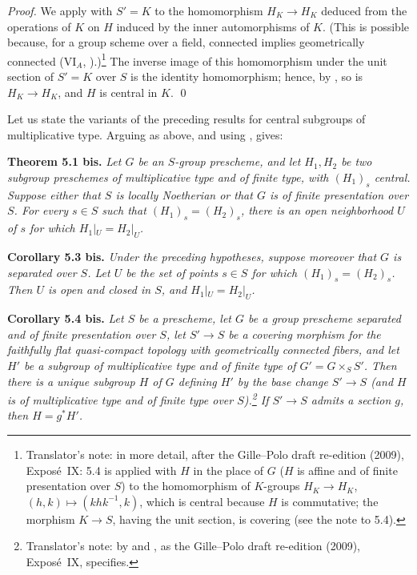 \emph{Proof.}
We apply  with \(S'=K\) to the
homomorphism \(H_K\to H_K\) deduced from the operations of \(K\) on \(H\)
induced by the inner automorphisms of \(K\). (This is possible because,
for a group scheme over a field, connected implies geometrically
connected (VI\(_A\), ).)\footnote{Translator's
note: in more detail, after the Gille--Polo draft re-edition (2009),
Expos\'e~IX: 5.4 is applied with \(H\) in the place of \(G\) (\(H\) is
affine and of finite presentation over \(S\)) to the homomorphism of
\(K\)-groups \(H_K\to H_K\), \((h,k)\mapsto(khk^{-1},k)\), which is central
because \(H\) is commutative; the morphism \(K\to S\), having the unit
section, is covering (see the note to 5.4).} The inverse image of this
homomorphism under the unit section of \(S'=K\) over \(S\) is the identity
homomorphism; hence, by , so is
\(H_K\to H_K\), and \(H\) is central in \(K\). \qed

Let us state the variants of the preceding results for central subgroups
of multiplicative type. Arguing as above, and using
, gives:

\medskip
\noindent{}\textbf{Theorem 5.1 bis.}
\textit{Let \(G\) be an \(S\)-group prescheme, and let \(H_1,H_2\) be
two subgroup preschemes of multiplicative type and of finite type, with
\((H_1)_s\) central. Suppose either that \(S\) is locally Noetherian or
that \(G\) is of finite presentation over \(S\). For every \(s\in S\)
such that \((H_1)_s=(H_2)_s\), there is an open neighborhood \(U\) of
\(s\) for which \(H_1|_U=H_2|_U\).}

\medskip
\noindent{}\textbf{Corollary 5.3 bis.}
\textit{Under the preceding hypotheses, suppose moreover that \(G\) is
separated over \(S\). Let \(U\) be the set of points \(s\in S\) for
which \((H_1)_s=(H_2)_s\). Then \(U\) is open and closed in \(S\), and
\(H_1|_U=H_2|_U\).}

\medskip
\noindent{}\textbf{Corollary 5.4 bis.}
\textit{Let \(S\) be a prescheme, let \(G\) be a group prescheme
separated and of finite presentation over \(S\), let \(S'\to S\) be a
covering morphism for the faithfully flat quasi-compact topology with
geometrically connected fibers, and let \(H'\) be a subgroup of
multiplicative type and of finite type of \(G'=G\times_SS'\).
Then there is a unique subgroup \(H\) of \(G\) defining \(H'\) by the
base change \(S'\to S\) (and \(H\) is of multiplicative type and of finite
type over \(S\)).\footnote{Translator's note: by
 and
, as the Gille--Polo
draft re-edition (2009), Expos\'e~IX, specifies.} If \(S'\to S\) admits a section \(g\), then
\(H=g^*H'\).}

